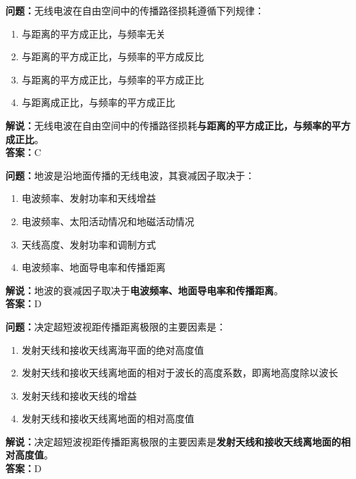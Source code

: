 \documentclass{ctexbook}
\begin{document}
\bigskip


\noindent\textbf{问题：}无线电波在自由空间中的传播路径损耗遵循下列规律：

\begin{enumerate}[label=\Alph*), leftmargin=3em]
	\item 与距离的平方成正比，与频率无关
	\item 与距离的平方成正比，与频率的平方成反比
	\item 与距离的平方成正比，与频率的平方成正比
	\item 与距离成正比，与频率的平方成正比
\end{enumerate}

\noindent\textbf{解说：}无线电波在自由空间中的传播路径损耗\textbf{与距离的平方成正比，与频率的平方成正比}。\\\noindent\textbf{答案：}C


\bigskip


\noindent\textbf{问题：}地波是沿地面传播的无线电波，其衰减因子取决于：

\begin{enumerate}[label=\Alph*), leftmargin=3em]
	\item 电波频率、发射功率和天线增益
	\item 电波频率、太阳活动情况和地磁活动情况
	\item 天线高度、发射功率和调制方式
	\item 电波频率、地面导电率和传播距离
\end{enumerate}

\noindent\textbf{解说：}地波的衰减因子取决于\textbf{电波频率、地面导电率和传播距离}。\\\noindent\textbf{答案：}D

\bigskip


\noindent\textbf{问题：}决定超短波视距传播距离极限的主要因素是：

\begin{enumerate}[label=\Alph*), leftmargin=3em]
	\item 发射天线和接收天线离海平面的绝对高度值
	\item 发射天线和接收天线离地面的相对于波长的高度系数，即离地高度除以波长
	\item 发射天线和接收天线的增益
	\item 发射天线和接收天线离地面的相对高度值
\end{enumerate}

\noindent\textbf{解说：}决定超短波视距传播距离极限的主要因素是\textbf{发射天线和接收天线离地面的相对高度值}。\\\noindent\textbf{答案：}D
\end{document}
